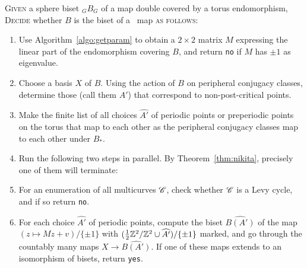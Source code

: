 \documentclass{amsart}
\begin{document}
\begin{algo}\label{algo:istor}
  \textsc{Given} a sphere biset ${}_G B_G$ of a map double covered by
  a torus endomorphism,\\
  \textsc{Decide} whether $B$ is the biset of a \Tor\ map \textsc{as
    follows:}\\\upshape
  \begin{enumerate}
  \item Use Algorithm~\ref{algo:getparam} to obtain a $2\times2$
    matrix $M$ expressing the linear part of the endomorphism covering
    $B$, and return \texttt{no} if $M$ has $\pm1$ as eigenvalue.
  \item Choose a basis $X$ of $B$. Using the action of $B$ on
    peripheral conjugacy classes, determine those (call them $A'$)
    that correspond to non-post-critical points.
  \item Make the finite list of all choices $\widehat{A'}$ of periodic
    points or preperiodic points on the torus that map to each other
    as the peripheral conjugacy classes map to each other under $B_*$.
  \item Run the following two steps in parallel. By
    Theorem~\ref{thm:nikita}, precisely one of them will terminate:
  \item For an enumeration of all multicurves ${\mathscr C}$, check whether
    ${\mathscr C}$ is a Levy cycle, and if so return \texttt{no}.
  \item For each choice $\widehat{A'}$ of periodic points, compute the
    biset $\widehat{B(A')}$ of the map $(z\mapsto M z+v)/\{\pm1\}$
    with $(\frac12{\mathbb Z}^2/{\mathbb Z}^2\cup\widehat{A'})/\{\pm1\}$ marked, and go
    through the countably many maps $X\to\widehat{B(A')}$. If one of
    these maps extends to an isomorphism of bisets, return
    \texttt{yes}.
  \end{enumerate}
\end{algo}
\end{document}
